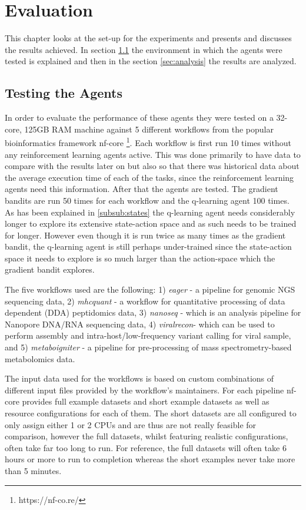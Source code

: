 
\cleardoublepage
\chapter{Evaluation}
\label{cha:evaluation}

This chapter looks at the set-up for the experiments and presents and discusses the results achieved. In section \ref{sec:testing} the environment in which the agents were tested is explained and then in the section \ref{sec:analysis} the results are analyzed. 

\section{Testing the Agents}
\label{sec:testing}

In order to evaluate the performance of these agents they were tested on a 32-core, 125GB RAM machine against 5 different workflows from the popular bioinformatics framework nf-core \footnote{https://nf-co.re/}. Each workflow is first run 10 times without any reinforcement learning agents active. This was done primarily to have data to compare with the results later on but also so that there was historical data about the average execution time of each of the tasks, since the reinforcement learning agents need this information. After that the agents are tested. The gradient bandits are run 50 times for each workflow and the q-learning agent 100 times. As has been explained in \ref{subsub:states} the q-learning agent needs considerably longer to explore its extensive state-action space and as such needs to be trained for longer. However even though it is run twice as many times as the gradient bandit, the q-learning agent is still perhaps under-trained since the state-action space it needs to explore is so much larger than the action-space which the gradient bandit explores.

The five workflows used are the following: 1) \textit{eager} - a pipeline for genomic NGS sequencing data, 2) \textit{mhcquant} - a workflow for quantitative processing of data dependent (DDA) peptidomics data, 3) \textit{nanoseq} - which is an analysis pipeline for Nanopore DNA/RNA sequencing data, 4) \textit{viralrecon}- which can be  used to perform assembly and intra-host/low-frequency variant calling for viral sample, and 5)  \textit{metaboigniter} - a pipeline for pre-processing of mass spectrometry-based metabolomics data. 

The input data used for the workflows is based on custom combinations of different input files provided by the workflow's maintainers. For each pipeline nf-core provides full example datasets and short example datasets as well as resource configurations for each of them. The short datasets are all configured to only assign either 1 or 2 CPUs and are thus are not really feasible for comparison, however the full datasets, whilst featuring realistic configurations, often take far too long to run. For reference, the full datasets will often take 6 hours or more to run to completion whereas the short examples never take more than 5 minutes. 


